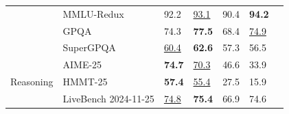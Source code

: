 \begin{table}[t]
\begin{tabular}{lllllll}
                                       & MMLU-Redux             & 92.2                       & \underline{93.1}                     & 90.4               & \textbf{94.2}                        \\
                                       & GPQA                   & 74.3                       & \textbf{77.5}                     & 68.4         & \underline{74.9}                        \\
                                       & SuperGPQA              & \underline{60.4}                       & \textbf{62.6}                     & 57.3                  & 56.5                           \\
\midrule
                                       & AIME-25                 & \textbf{74.7}                       & \underline{70.3}                     & 46.6         & 33.9                        \\

Reasoning                              & HMMT-25                 & \textbf{57.4}                       & \underline{55.4}                     & 27.5               & 15.9                        \\
                                       & LiveBench {\tiny 2024-11-25}          & \underline{74.8}                       & \textbf{75.4}                     & 66.9               & 74.6                        \\


\end{tabular}
\end{table}
